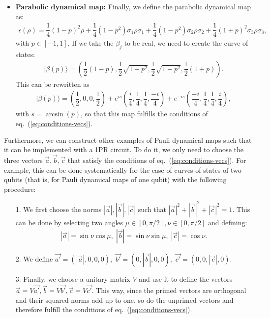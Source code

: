 \documentclass[10pt,letterpaper]{article} %
\newcommand{\eref}[1]{eq.~(\ref{#1})}
\begin{document}
\begin{itemize}
\item \textbf{Parabolic dynamical map:} Finally, we define the parabolic dynamical map as:
\begin{eqnarray}
\epsilon(\rho) = \dfrac{1}{4} (1-p)^2  \rho + \dfrac{1}{4} (1-p^2) \sigma_1 \rho \sigma_1 + \dfrac{1}{4} (1-p^2) \sigma_2 \rho \sigma_2 + \dfrac{1}{4} (1+p)^2 \sigma_3 \rho \sigma_3 ,
\end{eqnarray}
with $p \in [-1,1]$. 
If we take the $\beta_j$ to be real,
we need to create the curve of states:
\begin{eqnarray}
|\beta(p)\rangle = \left(\dfrac{1}{2} (1-p) , \dfrac{1}{2} \sqrt{1-p^2} , \dfrac{1}{2} \sqrt{1-p^2} , \dfrac{1}{2}(1+p) \right).
\end{eqnarray}
This can be rewritten as
\begin{align*}
|\beta(p)\rangle = \left( \dfrac{1}{2},0,0, \dfrac{1}{2} \right) + e^{is} \left( \dfrac{i}{4}, \dfrac{1}{4}, \dfrac{1}{4}, \dfrac{-i}{4} \right) + e^{-is}  \left( \dfrac{-i}{4}, \dfrac{1}{4}, \dfrac{1}{4}, \dfrac{i}{4} \right),
\end{align*}
with $s = \arcsin(p)$, so that
this map fulfills the conditions of  \eref{eq:conditions-vecs}.
\end{itemize}

Furthermore, we can construct other examples of 
Pauli dynamical maps such that it
can be implemented with a 1PR circuit.
To do it, we only need to choose the three vectors $\vec{a}, \vec{b},\vec{c}$
that satisfy the conditions of  \eref{eq:conditions-vecs}.
For example, this can be done systematically for the case of curves of states of two qubits
(that is, for Pauli dynamical maps of one qubit)
with the following procedure:
\begin{itemize}
\item[1.] We first choose the norms $|\vec{a}|, |\vec{b}|, |\vec{c}|$
such that $|\vec{a}|^2 + |\vec{b}|^2 + |\vec{c}|^2 = 1$. 
This can be done by selecting two angles
$\mu \in [0, \pi/2] , \nu \in [0,\pi/2]$ and defining:
\begin{align*}
|\vec{a}| = \sin \nu \cos \mu, \; |\vec{b}| = \sin \nu \sin \mu , \; |\vec{c}| = \cos \nu.
\end{align*}
\item[2.] We define $\vec{a'} = (|\vec{a}|,0,0,0),$ $\vec{b'} = (0,|\vec{b}|,0,0),$ $\vec{c'} = (0,0,|\vec{c}|,0)$.
\item[3.] Finally, we choose a unitary matrix $V$
and use it to define the vectors $\vec{a} = V \vec{a'}, \vec{b} = V \vec{b'}, \vec{c} = V \vec{c'}$.
This way, since the primed vectors are orthogonal and their squared norms add up to one,
so do the unprimed vectors and therefore 
fulfill the conditions of  \eref{eq:conditions-vecs}. 
\end{itemize}
\end{document}
